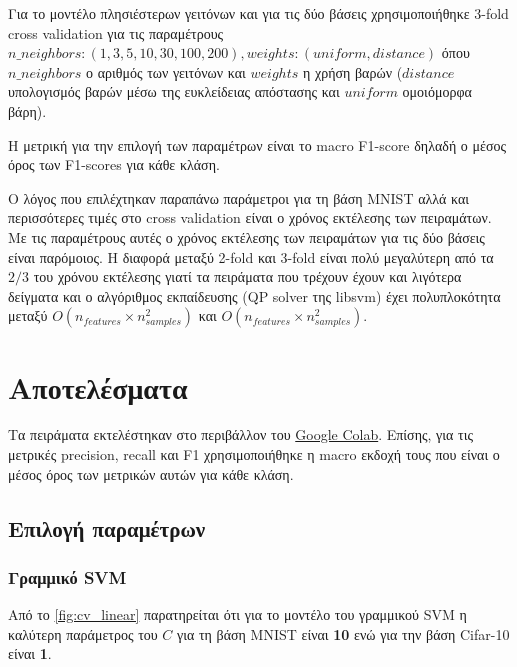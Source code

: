 \documentclass[a4paper]{article}
\begin{document}
Για το μοντέλο πλησιέστερων γειτόνων και για τις δύο βάσεις χρησιμοποιήθηκε
3-fold cross validation για τις παραμέτρους $n\_neighbors: (1, 3, 5, 10, 30,
100, 200), weights: (uniform, distance)$ όπου $n\_neighbors$ ο αριθμός των
γειτόνων και $weights$ η χρήση βαρών ($distance$ υπολογισμός βαρών μέσω της
ευκλείδειας απόστασης και $uniform$ ομοιόμορφα βάρη).

Η μετρική για την επιλογή των παραμέτρων είναι το macro F1-score δηλαδή ο μέσος
όρος των F1-scores για κάθε κλάση.

Ο λόγος που επιλέχτηκαν παραπάνω παράμετροι για τη βάση MNIST αλλά και
περισσότερες τιμές στο cross validation είναι ο χρόνος εκτέλεσης των πειραμάτων.
Με τις παραμέτρους αυτές ο χρόνος εκτέλεσης των πειραμάτων για τις δύο βάσεις
είναι παρόμοιος. Η διαφορά μεταξύ 2-fold και 3-fold είναι πολύ μεγαλύτερη από τα
$2/3$ του χρόνου εκτέλεσης γιατί τα πειράματα που τρέχουν έχουν και λιγότερα
δείγματα και ο αλγόριθμος εκπαίδευσης (QP solver της libsvm) έχει πολυπλοκότητα
μεταξύ $O(n_{features} \times n^2_{samples})$ και $O(n_{features} \times
n^2_{samples})$.


\section{Αποτελέσματα}

Τα πειράματα εκτελέστηκαν στο περιβάλλον του
\href{https://colab.research.google.com/}{Google Colab}. Επίσης, για τις
μετρικές precision, recall και F1 χρησιμοποιήθηκε η macro εκδοχή τους που είναι
ο μέσος όρος των μετρικών αυτών για κάθε κλάση.
 

\subsection{Επιλογή παραμέτρων}

\subsubsection{Γραμμικό SVM}

Από το \autoref{fig:cv_linear} παρατηρείται ότι για το μοντέλο του γραμμικού SVM
η καλύτερη παράμετρος του $C$ για τη βάση MNIST είναι {\bf10} ενώ για την βάση
Cifar-10 είναι {\bf1}.
\end{document}

